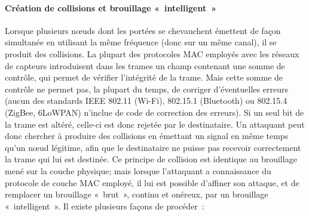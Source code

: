         \paragraph{Création de collisions et brouillage « intelligent »}
Lorsque plusieurs nœuds dont les portées se chevauchent émettent de façon simultanée en utilisant la même fréquence (donc sur un même canal), il se produit des collisions.
La plupart des protocoles MAC employés avec les réseaux de capteurs introduisent dans les trames un champ contenant une somme de contrôle, qui permet de vérifier l'intégrité de la trame.
Mais cette somme de contrôle ne permet pas, la plupart du temps, de corriger d'éventuelles erreurs (aucun des standards IEEE 802.11 (Wi-Fi), 802.15.1 (Bluetooth) ou 802.15.4 (ZigBee, 6LoWPAN) n'inclue de code de correction des erreurs).
Si un seul bit de la trame est altéré, celle-ci est donc rejetée par le destinataire.
Un attaquant peut donc chercher à produire des collisions en émettant un signal en même temps qu'un nœud légitime, afin que le destinataire ne puisse pas recevoir correctement la trame qui lui est destinée.
Ce principe de collision est identique au brouillage mené sur la couche physique; mais lorsque l'attaquant a connaissance du protocole de couche MAC employé, il lui est possible d'affiner son attaque, et de remplacer un brouillage « brut », continu et onéreux, par un brouillage « intelligent ».
Il existe plusieurs façons de procéder~\cite{PI11}:
